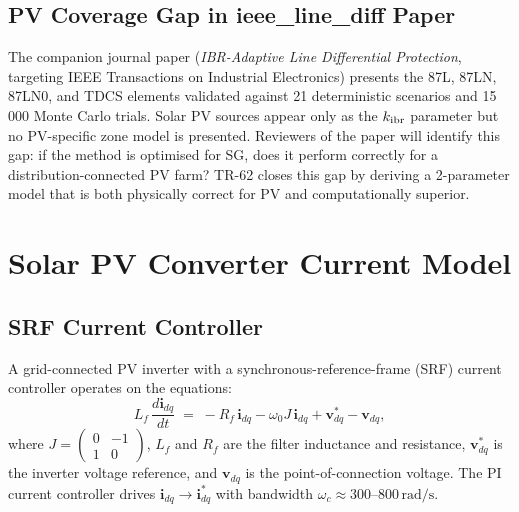 \documentclass[11pt, a4paper]{article}
\newcommand{\kIBR}{k_{\rm ibr}}
\begin{document}
\subsection{PV Coverage Gap in ieee\_line\_diff Paper}

The companion journal paper (\textit{IBR-Adaptive Line Differential Protection},
targeting IEEE Transactions on Industrial Electronics) presents the 87L,
87LN, 87LN0, and TDCS elements validated against 21 deterministic scenarios
and 15\,000 Monte Carlo trials.  Solar PV sources appear only as the $\kIBR$
parameter but no PV-specific zone model is presented.  Reviewers of the
paper will identify this gap: if the method is optimised for SG, does it
perform correctly for a distribution-connected PV farm?  TR-62 closes this
gap by deriving a 2-parameter model that is both physically correct for PV and
computationally superior.

\section{Solar PV Converter Current Model}
\label{sec:pv_current}

\subsection{SRF Current Controller}

A grid-connected PV inverter with a synchronous-reference-frame (SRF)
current controller operates on the equations:
\begin{equation}
  L_f\,\frac{d\mathbf{i}_{dq}}{dt} \;=\;
  -R_f\,\mathbf{i}_{dq} - \omega_0 J\,\mathbf{i}_{dq} + \mathbf{v}_{dq}^* - \mathbf{v}_{dq},
  \label{eq:srf}
\end{equation}
where $J = \begin{pmatrix}0 & -1\\ 1 & 0\end{pmatrix}$,
$L_f$ and $R_f$ are the filter inductance and resistance,
$\mathbf{v}_{dq}^*$ is the inverter voltage reference, and $\mathbf{v}_{dq}$
is the point-of-connection voltage.  The PI current controller drives
$\mathbf{i}_{dq} \to \mathbf{i}_{dq}^*$ with bandwidth $\omega_c \approx 300$--$800\,\text{rad/s}$.
\end{document}

